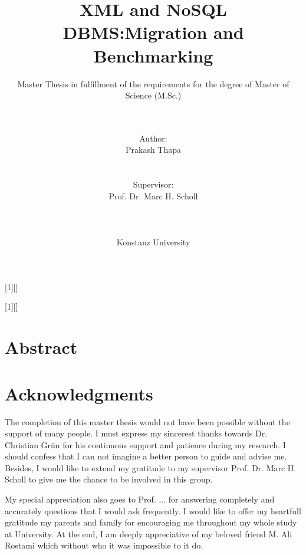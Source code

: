 \documentclass[a4paper,12pt]{article}
\title{XML and NoSQL DBMS:Migration and Benchmarking}
\subtitle{Master Thesis in fulfillment of the requirements for the degree of
Master of Science (M.Sc.)}
\author{\\\\Author: \\
	Prakash Thapa
	\\\\\\Supervisor: \\
	Prof. Dr. Marc H. Scholl \\ 
	\\\\\\
	Konstanz University}
\begin{document}
[1][]{
\lstset{#1}}{}

[1][]{
\lstset{#1}}{}


\renewcommand{\lstlistingname}{Code}


\maketitle
\thispagestyle{empty}

\newpage
\section*{Abstract}

\thispagestyle{empty}

\newpage
\section*{Acknowledgments}
\thispagestyle{empty}

The completion of this master thesis would not have been possible 
without the support of many people. 
I must express my sincerest thanks towards 
Dr. Christian Gr{\"u}n for his continuous support and patience during my research.
I should confess that I can not imagine a better person to guide and advise me. Besides, I would like to extend my gratitude to my supervisor Prof. Dr. Marc H. Scholl to give me the chance to be involved in this group.

My special appreciation also goes to Prof. ...  for
answering completely and accurately questions that I would ask
frequently. I would like to offer my heartfull gratitude my parents and family for encouraging me 
throughout my whole study at University. At the end, I am deeply appreciative of my beloved friend M. Ali Rostami which without who it was impossible to it do.
\end{document}
